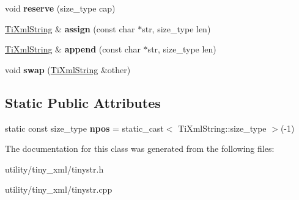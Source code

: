\begin{DoxyCompactItemize}
void {\bfseries reserve} (size\+\_\+type cap)
\item 
\hypertarget{class_ti_xml_string_ac72f3d9149b7812c1e6c59402014d0d5}{}\label{class_ti_xml_string_ac72f3d9149b7812c1e6c59402014d0d5} 
\hyperlink{class_ti_xml_string}{Ti\+Xml\+String} \& {\bfseries assign} (const char $\ast$str, size\+\_\+type len)
\item 
\hypertarget{class_ti_xml_string_ad44b21700d2ec24a511367b222b643fb}{}\label{class_ti_xml_string_ad44b21700d2ec24a511367b222b643fb} 
\hyperlink{class_ti_xml_string}{Ti\+Xml\+String} \& {\bfseries append} (const char $\ast$str, size\+\_\+type len)
\item 
\hypertarget{class_ti_xml_string_aa392cbc180752a79f007f4f9280c7762}{}\label{class_ti_xml_string_aa392cbc180752a79f007f4f9280c7762} 
void {\bfseries swap} (\hyperlink{class_ti_xml_string}{Ti\+Xml\+String} \&other)
\end{DoxyCompactItemize}
\subsection*{Static Public Attributes}
\begin{DoxyCompactItemize}
\item 
\hypertarget{class_ti_xml_string_a8f4422d227088dc7bec96f479b275d0a}{}\label{class_ti_xml_string_a8f4422d227088dc7bec96f479b275d0a} 
static const size\+\_\+type {\bfseries npos} = static\+\_\+cast$<$ Ti\+Xml\+String\+::size\+\_\+type $>$(-\/1)
\end{DoxyCompactItemize}


The documentation for this class was generated from the following files\+:\begin{DoxyCompactItemize}
\item 
utility/tiny\+\_\+xml/tinystr.\+h\item 
utility/tiny\+\_\+xml/tinystr.\+cpp\end{DoxyCompactItemize}
